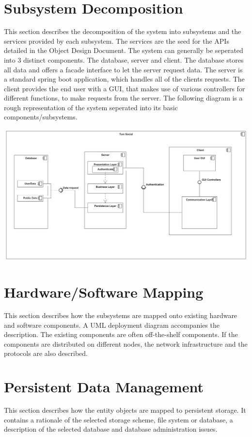 \documentclass[a4paper,12pt]{scrartcl}
\begin{document}
    \section{Subsystem Decomposition}
    This section describes the decomposition of the system into subsystems and the services provided by each subsystem. The services are the seed for the APIs detailed in the Object Design Document. The system can generally be seperated into 3 distinct components. The database, server and client. The database stores all data and offers a facade interface to let the server request data. The server is a standard spring boot application, which handles all of the clients requests. The client provides the end user with a GUI, that makes use of various controllers for different functions, to make requests from the server. The following diagram is a rough representation of the system seperated into its basic components/subsystems.
    	
    	
        \includegraphics[scale=0.15]{ComponentDiagram.png}
  


    \section{Hardware/Software Mapping}
    This section describes how the subsystems are mapped onto existing hardware and software components. A UML deployment diagram accompanies the description. The existing components are often off-the-shelf components. If the components are distributed on different nodes, the network infrastructure and the protocols are also described.


    \section{Persistent Data Management}
    This section describes how the entity objects are mapped to persistent storage.
    It contains a rationale of the selected storage scheme, file system or database, a description of the selected database and database administration issues.
\end{document}
